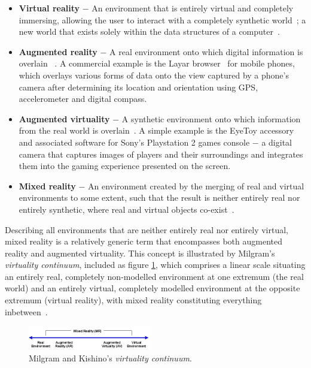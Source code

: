 \documentclass{sig-alternate}
\begin{document}
\begin{itemize}
	\item \textbf{Virtual reality} $-$ An environment that is entirely virtual and completely immersing, allowing the user to interact with a completely synthetic world~\cite{Milgram1999}; a new world that exists solely within the data structures of a computer~\cite{Want2009}.
	\item \textbf{Augmented reality} $-$ A real environment onto which digital information is overlain ~\cite{Want2009}. A commercial example is the Layar browser~\cite{eishita:layar} for mobile phones, which overlays various forms of data onto the view captured by a phone's camera after determining its location and orientation using GPS, accelerometer and digital compass.
	\item \textbf{Augmented virtuality} $-$ A synthetic environment onto which information from the real world is overlain~\cite{caballero:behand}. A simple example is the EyeToy accessory and associated software for Sony's Playstation 2 games console $-$ a digital camera that captures images of players and their surroundings and integrates them into the gaming experience presented on the screen.
	\item \textbf{Mixed reality} $-$ An environment created by the merging of real and virtual environments to some extent, such that the result is neither entirely real nor entirely synthetic, where real and virtual objects co-exist~\cite{Want2009}.
\end{itemize}

Describing all environments that are neither entirely real nor entirely virtual, mixed reality is a relatively generic term that encompasses both augmented reality and augmented virtuality. This concept is illustrated by Milgram's \textit{virtuality continuum}, included as figure \ref{virtualitycontinuum}, which comprises a linear scale situating an entirely real, completely non-modelled environment at one extremum (the real world) and an entirely virtual, completely modelled environment at the opposite extremum (virtual reality), with mixed reality constituting everything inbetween~\cite{Milgram1994}.

\begin{figure}[h!tbp]
\centering
\includegraphics[width=0.48\textwidth]{virtualitycontinuum.jpg}
\caption{Milgram and Kishino's \textit{virtuality continuum}.}
\label{virtualitycontinuum}
\end{figure}
\end{document}
